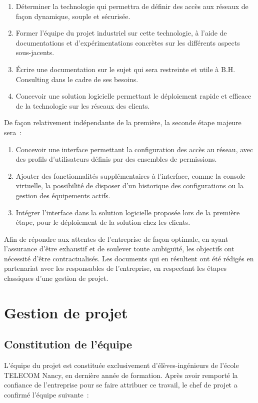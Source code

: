 \begin{enumerate}
\item Déterminer la technologie qui permettra de définir des accès aux réseaux de façon dynamique, souple et sécurisée.
\item Former l'équipe du projet industriel sur cette technologie, à l'aide de documentations et d'expérimentations concrètes sur les différents aspects sous-jacents.
\item Écrire une documentation sur le sujet qui sera restreinte et utile à B.H. Consulting dans le cadre de ses besoins.
\item Concevoir une solution logicielle permettant le déploiement rapide et efficace de la technologie sur les réseaux des clients.
\end{enumerate}

De façon relativement indépendante de la première, la seconde étape majeure sera~:

\begin{enumerate}
\item Concevoir une interface permettant la configuration des accès au réseau, avec des profils d'utilisateurs définis par des ensembles de permissions.
\item Ajouter des fonctionnalités supplémentaires à l'interface, comme la console virtuelle, la possibilité de disposer d'un historique des configurations ou la gestion des équipements actifs.
\item Intégrer l'interface dans la solution logicielle proposée lors de la première étape, pour le déploiement de la solution chez les clients.
\end{enumerate}

Afin de répondre aux attentes de l'entreprise de façon optimale, en ayant l'assurance d'être exhaustif et de soulever toute ambiguïté, les objectifs ont nécessité d'être contractualisés. Les documents qui en résultent ont été rédigés en partenariat avec les responsables de l'entreprise, en respectant les étapes classiques d'une gestion de projet.

\section{Gestion de projet}
\subsection{Constitution de l'équipe}

L'équipe du projet est constituée exclusivement d'élèves-ingénieurs de l'école TELECOM Nancy, en dernière année de formation. Après avoir remporté la confiance de l'entreprise pour se faire attribuer ce travail, le chef de projet a confirmé l'équipe suivante~:

